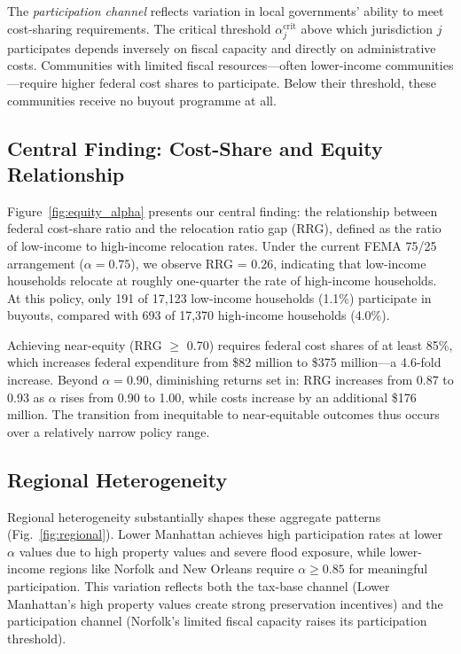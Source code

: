 \documentclass[12pt,a4paper]{article}
\begin{document}
The \textit{participation channel} reflects variation in local governments' ability to meet cost-sharing requirements. The critical threshold $\alpha_j^{\text{crit}}$ above which jurisdiction $j$ participates depends inversely on fiscal capacity and directly on administrative costs. Communities with limited fiscal resources---often lower-income communities---require higher federal cost shares to participate. Below their threshold, these communities receive no buyout programme at all.

\subsection{Central Finding: Cost-Share and Equity Relationship}

Figure~\ref{fig:equity_alpha} presents our central finding: the relationship between federal cost-share ratio and the relocation ratio gap (RRG), defined as the ratio of low-income to high-income relocation rates. Under the current FEMA 75/25 arrangement ($\alpha = 0.75$), we observe RRG = 0.26, indicating that low-income households relocate at roughly one-quarter the rate of high-income households. At this policy, only 191 of 17,123 low-income households (1.1\%) participate in buyouts, compared with 693 of 17,370 high-income households (4.0\%).

Achieving near-equity (RRG $\geq$ 0.70) requires federal cost shares of at least 85\%, which increases federal expenditure from \$82 million to \$375 million---a 4.6-fold increase. Beyond $\alpha = 0.90$, diminishing returns set in: RRG increases from 0.87 to 0.93 as $\alpha$ rises from 0.90 to 1.00, while costs increase by an additional \$176 million. The transition from inequitable to near-equitable outcomes thus occurs over a relatively narrow policy range.

\subsection{Regional Heterogeneity}

Regional heterogeneity substantially shapes these aggregate patterns (Fig.~\ref{fig:regional}). Lower Manhattan achieves high participation rates at lower $\alpha$ values due to high property values and severe flood exposure, while lower-income regions like Norfolk and New Orleans require $\alpha \geq 0.85$ for meaningful participation. This variation reflects both the tax-base channel (Lower Manhattan's high property values create strong preservation incentives) and the participation channel (Norfolk's limited fiscal capacity raises its participation threshold).
\end{document}
